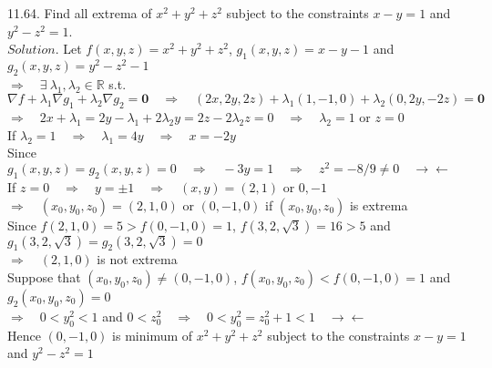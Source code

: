 \documentclass[12pt]{book}
\begin{document}
\begin{CJK}{UTF8}{bsmi}
11.64. Find all extrema of $x^2+y^2+z^2$ subject to the constraints $x-y=1$ and $y^2-z^2=1$. \\
$Solution$. Let $f(x, y, z)=x^2+y^2+z^2$, $g_1(x, y, z)=x-y-1$ and $g_2(x, y, z)=y^2-z^2-1$ \\
$\Rightarrow\quad\exists\ \lambda_1, \lambda_2\in\mathbb{R}$ s.t. $\nabla f+\lambda_1\nabla g_1+\lambda_2\nabla g_2=\mathbf{0}\quad\Rightarrow\quad(2x, 2y, 2z)+\lambda_1(1, -1, 0)+\lambda_2(0, 2y, -2z)=\mathbf{0}$ \\
$\Rightarrow\quad2x+\lambda_1=2y-\lambda_1+2\lambda_2y=2z-2\lambda_2z=0\quad\Rightarrow\quad\lambda_2=1$ or $z=0$ \\
If $\lambda_2=1\quad\Rightarrow\quad\lambda_1=4y\quad\Rightarrow\quad x=-2y$ \\
Since $g_1(x, y, z)=g_2(x, y, z)=0\quad\Rightarrow\quad-3y=1\quad\Rightarrow\quad z^2=-8/9\ne0\quad\rightarrow\leftarrow$ \\
If $z=0\quad\Rightarrow\quad y=\pm1\quad\Rightarrow\quad(x, y)=(2, 1)$ or $0, -1$ \\
$\Rightarrow\quad(x_0, y_0, z_0)=(2, 1, 0)$ or $(0, -1, 0)$ if $(x_0, y_0, z_0)$ is extrema \\
Since $f(2, 1, 0)=5>f(0, -1, 0)=1$, $f(3, 2, \sqrt{3})=16>5$ and $g_1(3, 2, \sqrt{3})=g_2(3, 2, \sqrt{3})=0$ \\
$\Rightarrow\quad(2, 1, 0)$ is not extrema \\
Suppose that $(x_0, y_0, z_0)\ne(0, -1, 0)$, $f(x_0, y_0, z_0)<f(0, -1, 0)=1$ and $g_2(x_0, y_0, z_0)=0$ \\
$\Rightarrow\quad0<y_0^2<1$ and $0<z_0^2\quad\Rightarrow\quad0<y_0^2=z_0^2+1<1\quad\rightarrow\leftarrow$ \\
Hence $(0, -1, 0)$ is minimum of $x^2+y^2+z^2$ subject to the constraints $x-y=1$ and $y^2-z^2=1$

\end{CJK}
\end{document}
